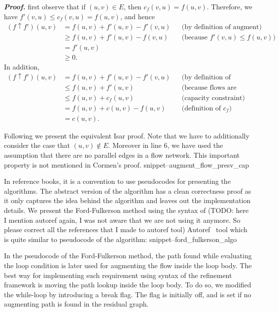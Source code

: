 \documentclass{llncs}
\newcommand{\Snippet}[1]{\csname snippet--#1\endcsname}
\begin{document}
\emph{\textbf{Proof.}} first observe that if $(u, v) \in E$, then $c_f(v, u) = f(u, v)$. Therefore, we have $f'(v,u) \leq c_f(v, u) = f(u, v)$, and hence
	\begin{align*}
	(f \uparrow f') (u, v) &= f(u, v) + f'(u, v) - f'(v, u)  && \text{(by definition of augment)} \\
	& \geq f(u, v) + f'(u, v) - f(v, u) && \text{(because $f'(v,u) \leq f(u, v)$)} \\
	& = f'(u, v) \\
	& \geq 0.
	\end{align*}
In addition,
	\begin{align*}
	(f \uparrow f') (u, v) &= f(u, v) + f'(u, v) - f'(v, u)  && \text{(by definition of augment)} \\
	& \leq f(u, v) + f'(u, v) && \text{(because flows are nonnegative)} \\
	& \leq f(u, v) + c_f(u, v) &&  \text{(capacity constraint)} \\
	& = f(u, v) + c(u, v) - f(u, v) && \text{(definition of $c_f$)} \\
	& = c (u, v).
	\end{align*}

Following we present the equivalent Isar proof. Note that we have to additionally consider the case that $(u, v) \notin E$. Moreover in line 6, we have used the assumption that there are no parallel edges in a flow network. This important property is not mentioned in Cormen's proof.
\Snippet{augment_flow_presv_cap}


In reference books, it is a convention to use pseudocodes for presenting the algorithms. The abstract version of the algorithm has a clean correctness proof as it only captures the idea behind the algorithm and leaves out the implementation details. We present the Ford-Fulkerson method using the syntax of (TODO: here I mention autoref again, I was not aware that we are not using it anymore. So please correct all the references that I made to autoref tool) Autoref~\cite{La13} tool which is quite similar to pseudocode of the algorithm:
\Snippet{ford_fulkerson_algo}

In the pseudocode of the Ford-Fulkerson method, the path found while evaluating the loop condition is later used for augmenting the flow inside the loop body. The best way for implementing such requirement using syntax of the refinement framework is moving the path lookup inside the loop body. To do so, we modified the while-loop by introducing a break flag. The flag is initially off, and is set if no augmenting path is found in the residual graph.
\end{document}
